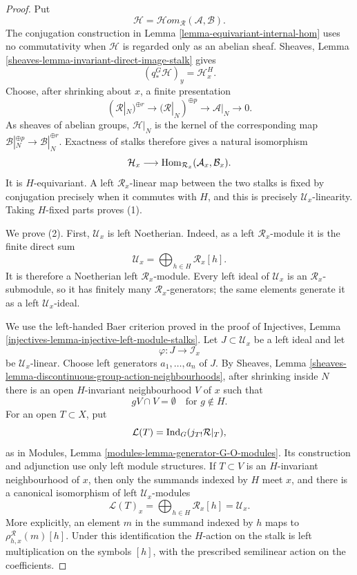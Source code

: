 \begin{proof}
Put
$$
\mathcal H=\mathcal H\!om_{\mathcal R}(\mathcal A,\mathcal B).
$$
The conjugation construction in Lemma
\ref{lemma-equivariant-internal-hom} uses no commutativity when $\mathcal H$
is regarded only as an abelian sheaf. Sheaves, Lemma
\ref{sheaves-lemma-invariant-direct-image-stalk} gives
$$
(q_*^G\mathcal H)_y=\mathcal H_x^H.
$$
Choose, after shrinking about $x$, a finite presentation
$$
(\mathcal R|_N)^{\oplus r}\longrightarrow
(\mathcal R|_N)^{\oplus p}\longrightarrow
\mathcal A|_N\longrightarrow 0.
$$
As sheaves of abelian groups,
$\mathcal H|_N$ is the kernel of the corresponding map
$\mathcal B|_N^{\oplus p}\to\mathcal B|_N^{\oplus r}$. Exactness of stalks
therefore gives a natural isomorphism
$$
\mathcal H_x\longrightarrow
\mathop{\rm Hom}\nolimits_{\mathcal R_x}
(\mathcal A_x,\mathcal B_x).
$$
It is $H$-equivariant. A left $\mathcal R_x$-linear map between the two
stalks is fixed by conjugation precisely when it commutes with $H$, and this
is precisely $\mathcal U_x$-linearity. Taking $H$-fixed parts proves (1).

We prove (2). First, $\mathcal U_x$ is left Noetherian. Indeed, as a left
$\mathcal R_x$-module it is the finite direct sum
$$
\mathcal U_x=\bigoplus_{h\in H}\mathcal R_x[h].
$$
It is therefore a Noetherian left $\mathcal R_x$-module. Every left ideal
of $\mathcal U_x$ is an $\mathcal R_x$-submodule, so it has finitely many
$\mathcal R_x$-generators; the same elements generate it as a left
$\mathcal U_x$-ideal.

We use the left-handed Baer criterion proved in the proof of Injectives,
Lemma \ref{injectives-lemma-injective-left-module-stalks}. Let
$J\subset\mathcal U_x$ be a left ideal and let
$$
\varphi:J\longrightarrow\mathcal I_x
$$
be $\mathcal U_x$-linear. Choose left generators
$a_1,\ldots,a_n$ of $J$. By Sheaves, Lemma
\ref{sheaves-lemma-discontinuous-group-action-neighbourhoods}, after
shrinking inside $N$ there is an open $H$-invariant neighbourhood $V$ of
$x$ such that
$$
gV\cap V=\emptyset\quad\text{for }g\notin H.
$$
For an open $T\subset X$, put
$$
\mathcal L(T)=
\mathop{\rm Ind}\nolimits_G(j_{T!}\mathcal R|_T),
$$
as in Modules, Lemma \ref{modules-lemma-generator-G-O-modules}. Its
construction and adjunction use only left module structures. If $T\subset
V$ is an $H$-invariant neighbourhood of $x$, then only the summands indexed
by $H$ meet $x$, and there is a canonical isomorphism of left
$\mathcal U_x$-modules
$$
\mathcal L(T)_x
=
\bigoplus_{h\in H}\mathcal R_x[h]
=
\mathcal U_x.
$$
More explicitly, an element $m$ in the summand indexed by $h$ maps to
$\rho^{\mathcal R}_{h,x}(m)[h]$. Under this identification the $H$-action
on the stalk is left multiplication on the symbols $[h]$, with the
prescribed semilinear action on the coefficients.


\end{proof}

